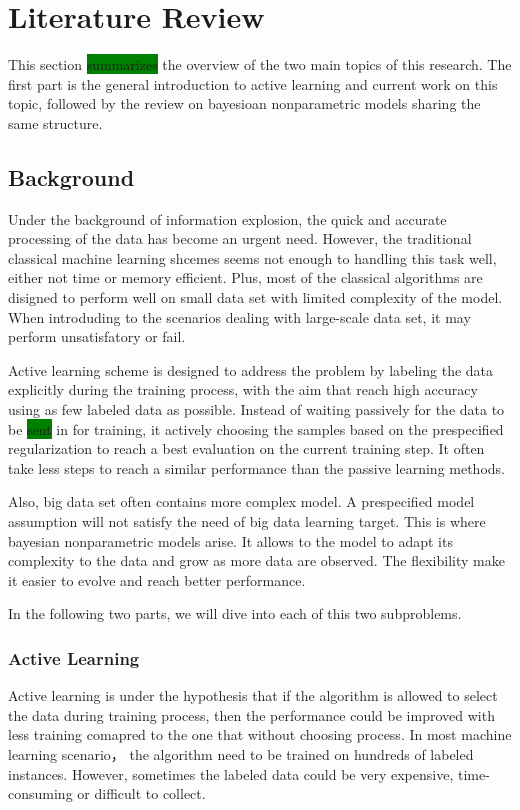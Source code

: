 \section{Literature Review}
This section \colorbox{green}{summarizes} the overview of the two main topics of this research. The first part is the general introduction to active learning and current work on this topic, followed by the review on bayesioan nonparametric models sharing the same structure. 
\newcommand{\argmax}[1]{\underset{#1}{\operatorname{arg}\,\operatorname{max}}\;}
\newcommand{\argmin}[1]{\underset{#1}{\operatorname{arg}\,\operatorname{min}}\;}
\subsection{Background}
Under the background of information explosion, the quick and accurate processing of the data has become an urgent need. However, the traditional classical machine learning shcemes seems not enough to handling this task well, either not time or memory efficient\cite{druck2009active,huang2010active}. Plus, most of the classical algorithms are disigned to perform well on small data set with limited complexity of the model. When introduding to the scenarios dealing with large-scale data set, it may perform unsatisfatory or fail.

Active learning scheme is designed to address the problem by labeling the data explicitly during the training process, with the aim that reach high accuracy using as few labeled data as possible\cite{Prince2004,Settles2010}. Instead of waiting passively for the data to be \colorbox{green}{sent} in for training, it actively choosing the samples based on the prespecified regularization to reach a best evaluation on the current training step. It often take less steps to reach a similar performance than the passive learning methods. 

Also, big data set often contains more complex model\cite{escobar1995bayesian}. A prespecified model assumption will not satisfy the need of big data learning target. This is where bayesian nonparametric models arise. It allows to the model to adapt its complexity to the data and grow as more data are observed\cite{hjort2010bayesian}. The flexibility make it easier to evolve and reach better performance. 

In the following two parts, we will dive into each of this two subproblems.

\subsubsection{Active Learning}
Active learning is under the hypothesis that if the algorithm is allowed to select the data during training process, then the performance could be improved with less training comapred to the one that without choosing process\colorbox{green}{\cite{Settles2010}}.  In most machine learning scenario\cite{Prince2004,huang2010active}， the algorithm need to be trained on hundreds of labeled instances. However, sometimes the labeled data could be very expensive, time-consuming or difficult to collect. 

